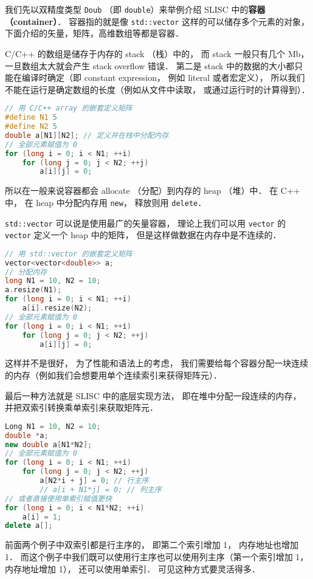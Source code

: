 
\begin{issues}
\issueDraft
\end{issues}


我们先以双精度类型 \verb|Doub| （即 \verb|double|）来举例介绍 SLISC 中的\textbf{容器（container）}． 容器指的就是像 \verb|std::vector| 这样的可以储存多个元素的对象， 下面介绍的矢量，矩阵，高维数组等都是容器．

C/C++ 的数组是储存于内存的 stack （栈）中的， 而 stack 一般只有几个 Mb， 一旦数组太大就会产生 stack overflow 错误． 第二是 stack 中的数据的大小都只能在编译时确定（即 constant expression， 例如 literal 或者宏定义）， 所以我们不能在运行是确定数组的长度（例如从文件中读取， 或通过运行时的计算得到）．
\begin{lstlisting}[language=cpp]
// 用 C/C++ array 的嵌套定义矩阵
#define N1 5
#define N2 5
double a[N1][N2]; // 定义并在栈中分配内存
// 全部元素赋值为 0
for (long i = 0; i < N1; ++i)
    for (long j = 0; j < N2; ++j)
        a[i][j] = 0;
\end{lstlisting}

所以在一般来说容器都会 allocate （分配）到内存的 heap （堆）中． 在 C++ 中， 在 heap 中分配内存用 \verb|new|， 释放则用 \verb|delete|．

\verb|std::vector| 可以说是使用最广的矢量容器， 理论上我们可以用 \verb|vector| 的 \verb|vector| 定义一个 heap 中的矩阵， 但是这样做数据在内存中是不连续的．
\begin{lstlisting}[language=cpp]
// 用 std::vector 的嵌套定义矩阵
vector<vector<double>> a;
// 分配内存
long N1 = 10, N2 = 10;
a.resize(N1);
for (long i = 0; i < N1; ++i)
    a[i].resize(N2);
// 全部元素赋值为 0
for (long i = 0; i < N1; ++i)
    for (long j = 0; j < N2; ++j)
        a[i][j] = 0;
\end{lstlisting}
这样并不是很好， 为了性能和语法上的考虑， 我们需要给每个容器分配一块连续的内存（例如我们会想要用单个连续索引来获得矩阵元）．

最后一种方法就是 SLISC 中的底层实现方法， 即在堆中分配一段连续的内存， 并把双索引转换乘单索引来获取矩阵元．
\begin{lstlisting}[language=cpp]
Long N1 = 10, N2 = 10;
double *a;
new double a[N1*N2];
// 全部元素赋值为 0
for (long i = 0; i < N1; ++i)
    for (long j = 0; j < N2; ++j)
        a[N2*i + j] = 0; // 行主序
        // a[i + N1*j] = 0; // 列主序
// 或者直接使用单索引赋值更快
for (long i = 0; i < N1*N2; ++i)
    a[i] = 1;
delete a[];
\end{lstlisting}
前面两个例子中双索引都是行主序的， 即第二个索引增加 1， 内存地址也增加 1． 而这个例子中我们既可以使用行主序也可以使用列主序（第一个索引增加 1， 内存地址增加 1）， 还可以使用单索引． 可见这种方式要灵活得多．

